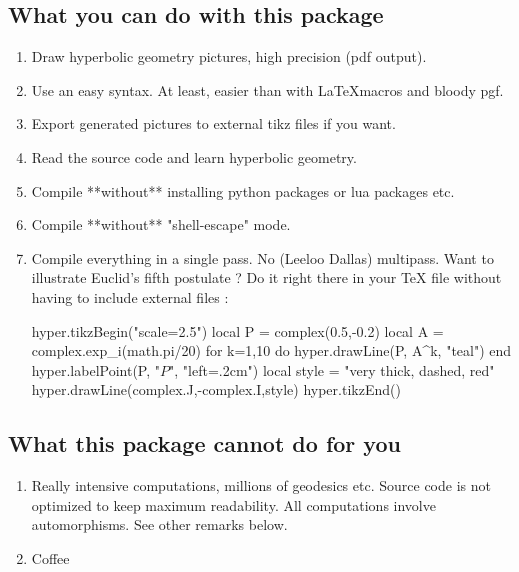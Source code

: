 \documentclass{article}
\begin{document}
\subsection{What you can do with this package}
\begin{enumerate}
\item Draw hyperbolic geometry pictures, high precision (pdf output).
\item Use an easy syntax. At least, easier than with \LaTeX macros and bloody pgf.
\item Export generated pictures to external tikz files if you want.
\item Read the source code and learn hyperbolic geometry.
\item Compile **without** installing python packages or lua packages etc.
\item Compile **without**  "shell-escape" mode.
\item Compile everything in a single pass. No (Leeloo Dallas) multipass.
Want to illustrate Euclid's fifth postulate ?
Do it right there in your TeX file without having to include external files :

\begin{codeandresult}
\begin{luacode*}
hyper.tikzBegin("scale=2.5")
local P = complex(0.5,-0.2)
local A = complex.exp_i(math.pi/20)
for k=1,10 do
	hyper.drawLine(P, A^k, "teal")
end
hyper.labelPoint(P, "$P$", "left=.2cm")
local style = "very thick, dashed, red"
hyper.drawLine(complex.J,-complex.I,style)
hyper.tikzEnd()
\end{luacode*}
\end{codeandresult}

\end{enumerate}

\subsection{What this package cannot do for you}

\begin{enumerate}
\item Really intensive computations, millions of geodesics etc.  Source code is not optimized to keep maximum readability. All computations involve automorphisms. See other remarks below.
\item Coffee
\end{enumerate}
\end{document}
